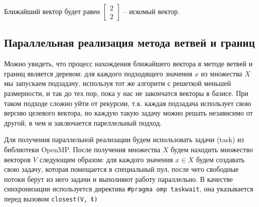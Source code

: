 Ближайший вектор будет равен $ \left[\begin{array}{cccc}
2 \\
2
\end{array}\right] $ -- искомый вектор.

\subsection{Параллельная реализация метода ветвей и границ}

Можно увидеть, что процесс нахождения ближайшего вектора в методе ветвей и границ является деревом: для каждого подходящего значения $ x $ из множества $ X $ мы запускаем подзадачу, используя тот же алгоритм с решеткой меньшей размерности, и так до тех пор, пока у нас не закончатся векторы в базисе. При таком подходе сложно уйти от рекурсии, т.к. каждая подзадача использует свою версию целевого вектора, но каждую такую задачу можно решать независимо от другой, в чем и заключается пареллельный подход.

Для получения параллельной реализации будем использовать задачи (task) из библиотеки OpenMP. После получения множества $ X $ будем находить множество векторов $ V $ следующим образом: для каждого значения $ x \in X $ будем создавать свою задачу, которая помещается в специальный пул, после чего свободные потоки берут из него задачи и выполняют работу параллельно. В качестве синхронизации используется директива \verb!#pragma omp taskwait!, она указывается перед вызовом \verb!closest(V, !\textbf{t}\verb!)!

\clearpage